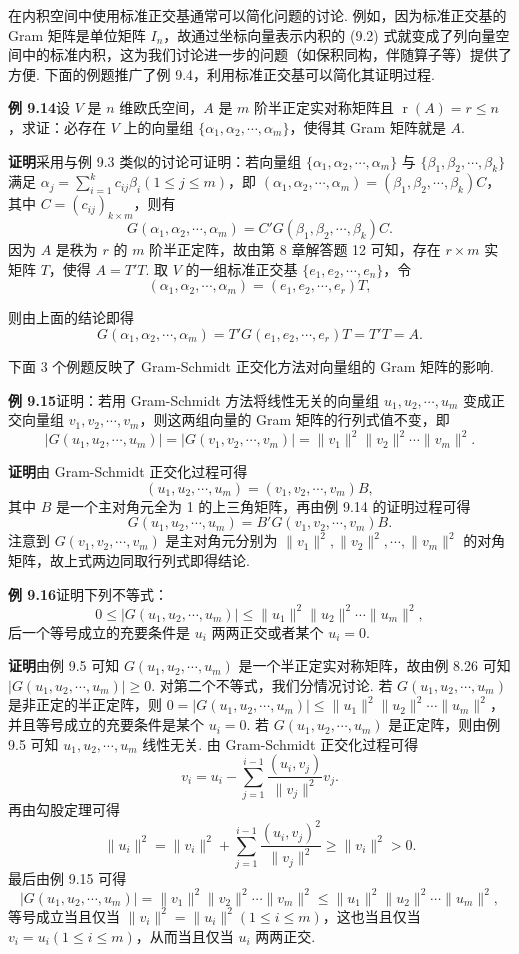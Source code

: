 \documentclass[UTF8,12pt,a4paper,fontset=fandol]{ctexart}
\begin{document}
在内积空间中使用标准正交基通常可以简化问题的讨论. 例如，因为标准正交基的 Gram 矩阵是单位矩阵 $I_n$，故通过坐标向量表示内积的 (9.2) 式就变成了列向量空间中的标准内积，这为我们讨论进一步的问题（如保积同构，伴随算子等）提供了方便. 下面的例题推广了例 9.4，利用标准正交基可以简化其证明过程.

\noindent\textbf{例 9.14}\quad 设 $V$ 是 $n$ 维欧氏空间，$A$ 是 $m$ 阶半正定实对称矩阵且 $\operatorname{r}(A)=r\le n$，求证：必存在 $V$ 上的向量组 $\{\alpha_1,\alpha_2,\cdots,\alpha_m\}$，使得其 Gram 矩阵就是 $A$.

\noindent\textbf{证明}\quad 采用与例 9.3 类似的讨论可证明：若向量组 $\{\alpha_1,\alpha_2,\cdots,\alpha_m\}$ 与 $\{\beta_1,\beta_2,\cdots,\beta_k\}$ 满足 $\alpha_j=\sum_{i=1}^k c_{ij}\beta_i(1\le j\le m)$，即 $(\alpha_1,\alpha_2,\cdots,\alpha_m)=(\beta_1,\beta_2,\cdots,\beta_k)C$，其中 $C=(c_{ij})_{k\times m}$，则有
\[
G(\alpha_1,\alpha_2,\cdots,\alpha_m)=C'G(\beta_1,\beta_2,\cdots,\beta_k)C.
\]
因为 $A$ 是秩为 $r$ 的 $m$ 阶半正定阵，故由第 8 章解答题 12 可知，存在 $r\times m$ 实矩阵 $T$，使得 $A=T'T$. 取 $V$ 的一组标准正交基 $\{e_1,e_2,\cdots,e_n\}$，令
\[
(\alpha_1,\alpha_2,\cdots,\alpha_m)=(e_1,e_2,\cdots,e_r)T,
\]

则由上面的结论即得
\[
G(\alpha_1,\alpha_2,\cdots,\alpha_m)=T'G(e_1,e_2,\cdots,e_r)T=T'T=A.
\]

下面 3 个例题反映了 Gram-Schmidt 正交化方法对向量组的 Gram 矩阵的影响.

\noindent\textbf{例 9.15}\quad 证明：若用 Gram-Schmidt 方法将线性无关的向量组 $u_1,u_2,\cdots,u_m$ 变成正交向量组 $v_1,v_2,\cdots,v_m$，则这两组向量的 Gram 矩阵的行列式值不变，即
\[
|G(u_1,u_2,\cdots,u_m)|=|G(v_1,v_2,\cdots,v_m)|=\|v_1\|^2\|v_2\|^2\cdots\|v_m\|^2.
\]

\noindent\textbf{证明}\quad 由 Gram-Schmidt 正交化过程可得
\[
(u_1,u_2,\cdots,u_m)=(v_1,v_2,\cdots,v_m)B,
\]
其中 $B$ 是一个主对角元全为 1 的上三角矩阵，再由例 9.14 的证明过程可得
\[
G(u_1,u_2,\cdots,u_m)=B'G(v_1,v_2,\cdots,v_m)B.
\]
注意到 $G(v_1,v_2,\cdots,v_m)$ 是主对角元分别为 $\|v_1\|^2,\|v_2\|^2,\cdots,\|v_m\|^2$ 的对角矩阵，故上式两边同取行列式即得结论.

\noindent\textbf{例 9.16}\quad 证明下列不等式：
\[
0\le |G(u_1,u_2,\cdots,u_m)|\le \|u_1\|^2\|u_2\|^2\cdots\|u_m\|^2,
\]
后一个等号成立的充要条件是 $u_i$ 两两正交或者某个 $u_i=0$.

\noindent\textbf{证明}\quad 由例 9.5 可知 $G(u_1,u_2,\cdots,u_m)$ 是一个半正定实对称矩阵，故由例 8.26 可知 $|G(u_1,u_2,\cdots,u_m)|\ge 0$. 对第二个不等式，我们分情况讨论. 若 $G(u_1,u_2,\cdots,u_m)$ 是非正定的半正定阵，则 $0=|G(u_1,u_2,\cdots,u_m)|\le \|u_1\|^2\|u_2\|^2\cdots\|u_m\|^2$，并且等号成立的充要条件是某个 $u_i=0$. 若 $G(u_1,u_2,\cdots,u_m)$ 是正定阵，则由例 9.5 可知 $u_1,u_2,\cdots,u_m$ 线性无关. 由 Gram-Schmidt 正交化过程可得
\[
v_i=u_i-\sum_{j=1}^{i-1}\frac{(u_i,v_j)}{\|v_j\|^2}v_j.
\]
再由勾股定理可得
\[
\|u_i\|^2=\|v_i\|^2+\sum_{j=1}^{i-1}\frac{(u_i,v_j)^2}{\|v_j\|^2}\ge \|v_i\|^2>0.
\]
最后由例 9.15 可得
\[
|G(u_1,u_2,\cdots,u_m)|=\|v_1\|^2\|v_2\|^2\cdots\|v_m\|^2
\le \|u_1\|^2\|u_2\|^2\cdots\|u_m\|^2,
\]
等号成立当且仅当 $\|v_i\|^2=\|u_i\|^2(1\le i\le m)$，这也当且仅当 $v_i=u_i(1\le i\le m)$，从而当且仅当 $u_i$ 两两正交.
\end{document}
